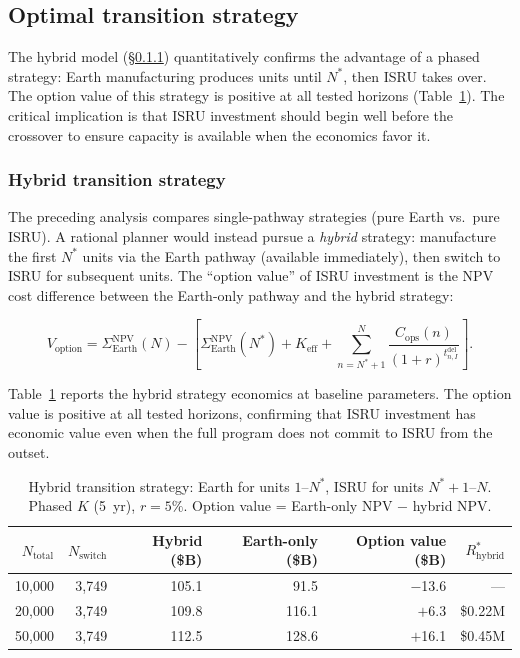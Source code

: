 \documentclass[preprint,12pt]{elsarticle}
\begin{document}
\subsection{Optimal transition strategy}

The hybrid model (\S\ref{sec:hybrid}) quantitatively confirms the advantage of a phased strategy: Earth manufacturing produces units until $N^*$, then ISRU takes over. The option value of this strategy is positive at all tested horizons (Table~\ref{tab:hybrid}). The critical implication is that ISRU investment should begin well before the crossover to ensure capacity is available when the economics favor it.

\subsubsection{Hybrid transition strategy}
\label{sec:hybrid}

The preceding analysis compares single-pathway strategies (pure Earth vs.\ pure ISRU). A rational planner would instead pursue a \emph{hybrid} strategy: manufacture the first $N^*$ units via the Earth pathway (available immediately), then switch to ISRU for subsequent units. The ``option value'' of ISRU investment is the NPV cost difference between the Earth-only pathway and the hybrid strategy:

\begin{equation}
  V_{\mathrm{option}} = \Sigma_{\mathrm{Earth}}^{\mathrm{NPV}}(N) - \left[\Sigma_{\mathrm{Earth}}^{\mathrm{NPV}}(N^*) + K_{\mathrm{eff}} + \sum_{n=N^*+1}^{N} \frac{C_{\mathrm{ops}}(n)}{(1+r)^{t_{n,I}^{\mathrm{del}}}}\right].
  \label{eq:hybrid}
\end{equation}

Table~\ref{tab:hybrid} reports the hybrid strategy economics at baseline parameters. The option value is positive at all tested horizons, confirming that ISRU investment has economic value even when the full program does not commit to ISRU from the outset.

\begin{table}[htbp]
\centering
\caption{Hybrid transition strategy: Earth for units $1$--$N^*$, ISRU for units $N^*+1$--$N$. Phased $K$ (5~yr), $r = 5\%$. Option value = Earth-only NPV $-$ hybrid NPV.}
\label{tab:hybrid}
\small
\begin{tabular}{@{}rrrrrr@{}}
\toprule
$N_{\mathrm{total}}$ & $N_{\mathrm{switch}}$ & Hybrid (\$B) & Earth-only (\$B) & Option value (\$B) & $R^*_{\mathrm{hybrid}}$ \\
\midrule
10{,}000  & 3{,}749  & 105.1 & 91.5 & $-$13.6 & --- \\
20{,}000  & 3{,}749  & 109.8 & 116.1 & $+$6.3 & \$0.22M \\
50{,}000  & 3{,}749  & 112.5 & 128.6 & $+$16.1 & \$0.45M \\
\bottomrule
\end{tabular}
\end{table}
\end{document}
